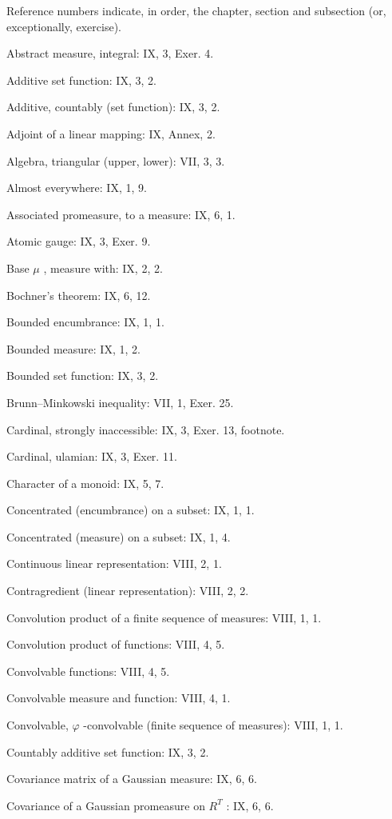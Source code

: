 
Reference numbers indicate, in order, the chapter, section and subsection (or, exceptionally, exercise).

Abstract measure, integral: IX, 3, Exer. 4.

Additive set function: IX, 3, 2.

Additive, countably (set function): IX, 3, 2.

Adjoint of a linear mapping: IX, Annex, 2.

Algebra, triangular (upper, lower): VII, 3, 3.

Almost everywhere: IX, 1, 9.

Associated promeasure, to a measure: IX, 6, 1.

Atomic gauge: IX, 3, Exer. 9.

Base \(\mu\) , measure with: IX, 2, 2.

Bochner's theorem: IX, 6, 12.

Bounded encumbrance: IX, 1, 1.

Bounded measure: IX, 1, 2.

Bounded set function: IX, 3, 2.

Brunn--Minkowski inequality: VII, 1, Exer. 25.

Cardinal, strongly inaccessible: IX, 3, Exer. 13, footnote.

Cardinal, ulamian: IX, 3, Exer. 11.

Character of a monoid: IX, 5, 7.

Concentrated (encumbrance) on a subset: IX, 1, 1.

Concentrated (measure) on a subset: IX, 1, 4.

Continuous linear representation: VIII, 2, 1.

Contragredient (linear representation): VIII, 2, 2.

Convolution product of a finite sequence of measures: VIII, 1, 1.

Convolution product of functions: VIII, 4, 5.

Convolvable functions: VIII, 4, 5.

Convolvable measure and function: VIII, 4, 1.

Convolvable, \(\varphi\) -convolvable (finite sequence of measures): VIII, 1, 1.

Countably additive set function: IX, 3, 2.

Covariance matrix of a Gaussian measure: IX, 6, 6.

Covariance of a Gaussian promeasure on \(R^{T}\) : IX, 6, 6.

